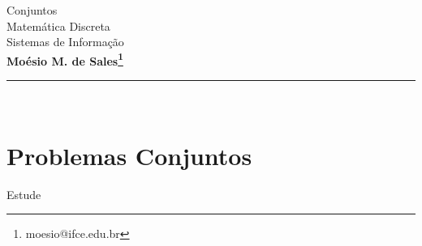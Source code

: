 \documentclass[11pt,a4paper]{article}
\makeatletter
\newcommand{\nome}{\bf Moésio M. de Sales\footnote{moesio@ifce.edu.br}}
\newcommand{\titu}{Conjuntos}
\newcommand{\disc}{Matemática Discreta}
\newcommand{\curso}{Sistemas de Informação}
\makeatother
\begin{document}
{\Large
\begin{center} \titu\\ \disc\\ \curso \\  \nome\end{center}
}
\hfill   %
\hrule\ 
\section{\sc Problemas Conjuntos}

Estude\cite{gersting2004fundamentos,Ed1976teoria,scheinerman2003mat}

\bexer















\eexerc
\printbibliography
\end{document}
